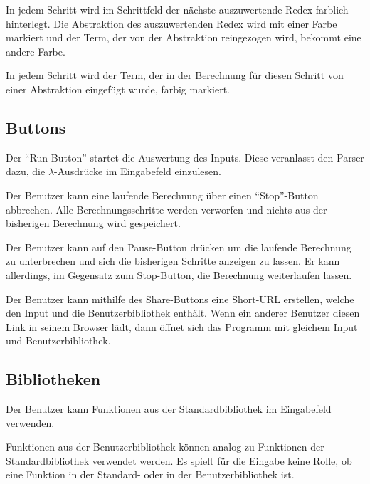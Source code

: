 \documentclass[parskip=full,11pt,twoside]{scrartcl}
\begin{document}
In jedem Schritt wird im Schrittfeld der nächste auszuwertende Redex farblich hinterlegt.
Die Abstraktion des auszuwertenden Redex wird mit einer Farbe markiert und der Term, der von der Abstraktion reingezogen wird, bekommt eine andere Farbe.

In jedem Schritt wird der Term, der in der Berechnung für diesen Schritt von einer Abstraktion eingefügt wurde, farbig markiert.


\subsection{Buttons}

Der \enquote{Run-Button} startet die Auswertung des Inputs. Diese veranlasst den Parser dazu, die $\lambda$-Ausdrücke im Eingabefeld einzulesen.

Der Benutzer kann eine laufende Berechnung über einen \enquote{Stop}-Button abbrechen. Alle Berechnungsschritte werden verworfen und nichts aus der bisherigen Berechnung wird gespeichert.

Der Benutzer kann auf den Pause-Button drücken um die laufende Berechnung zu unterbrechen und sich die bisherigen Schritte anzeigen zu lassen. Er kann allerdings, im Gegensatz zum Stop-Button, die Berechnung weiterlaufen lassen.

Der Benutzer kann mithilfe des Share-Buttons eine Short-URL erstellen, welche den Input und die Benutzerbibliothek enthält. Wenn ein anderer Benutzer diesen Link in seinem Browser lädt, dann öffnet sich das Programm mit gleichem Input und Benutzerbibliothek.



\subsection{Bibliotheken}

Der Benutzer kann Funktionen aus der Standardbibliothek im Eingabefeld verwenden.

Funktionen aus der Benutzerbibliothek können analog zu Funktionen der Standardbibliothek verwendet werden. Es spielt für die Eingabe keine Rolle, ob eine Funktion in der Standard- oder in der Benutzerbibliothek ist.
\end{document}
